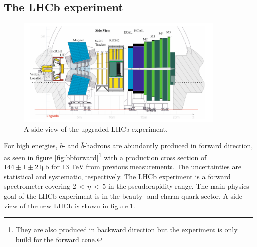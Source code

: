 \subsection{The LHCb experiment}
\label{sec:upgradeLHCb}

\begin{figure}
  \centering
  \includegraphics[width=0.9\textwidth]{plots/LHCb_facility.png}
  \caption{A side view of the upgraded LHCb experiment\cite{facilityLHCb}.}
  \label{fig:LHCb}
\end{figure}

For high energies, $b$- and $\bar{b}$-hadrons are abundantly produced in forward
direction, as seen in figure \ref{fig:bbforward}\footnote{They are also produced in backward direction but the experiment is only build for the forward cone.} with a production cross section of $144 \pm 1 \pm 21 \si{\micro\barn}$ \cite{bbXsection} for $\SI{13}{\tera\electronvolt}$ from previous measurements.
The uncertainties are statistical and systematic, respectively.
The LHCb experiment\cite{lhcbInfo} is a forward spectrometer covering $2 \,<\, \eta \,<\, 5$ in the pseudorapidity range. The main physics goal of the LHCb experiment is in the beauty- and charm-quark sector. A side-view of the new LHCb is shown in figure \ref{fig:LHCb}.

